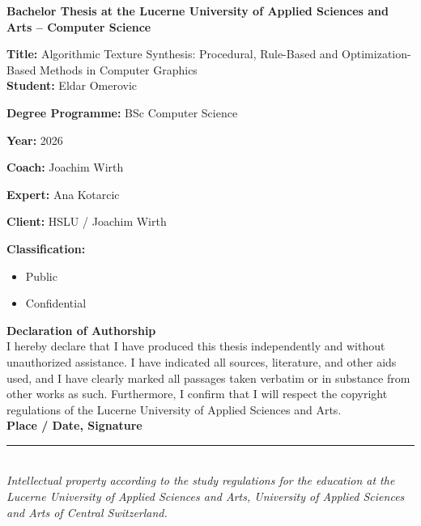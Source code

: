 \textbf{\large Bachelor Thesis at the Lucerne University of Applied Sciences and Arts -- Computer Science}

\textbf{Title:} Algorithmic Texture Synthesis: Procedural, Rule-Based and Optimization-Based Methods in Computer Graphics\\[0.5em]

\textbf{Student:} Eldar Omerovic

\textbf{Degree Programme:} BSc Computer Science

\textbf{Year:} 2026

\textbf{Coach:} Joachim Wirth

\textbf{Expert:} Ana Kotarcic

\textbf{Client:} HSLU / Joachim Wirth

\textbf{Classification:}
\begin{itemize}
    \item Public 
    \item Confidential
  \end{itemize}

\vspace{2em}

\textbf{Declaration of Authorship}\\[0.5em]
I hereby declare that I have produced this thesis independently and without unauthorized assistance. I have indicated all sources, literature, and other aids used, and I have clearly marked all passages taken verbatim or in substance from other works as such. Furthermore, I confirm that I will respect the copyright regulations of the Lucerne University of Applied Sciences and Arts.\\[1.5em]

\textbf{Place / Date, Signature}\\[3em]
\rule{7cm}{0.4pt}\\

\textit{Intellectual property according to the study regulations for the education at the Lucerne University of Applied Sciences and Arts, University of Applied Sciences and Arts of Central Switzerland.}